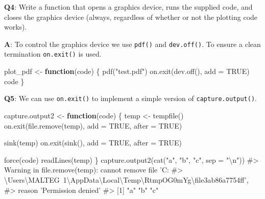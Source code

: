 \documentclass[
]{krantz}
\makeatletter
\newenvironment{Shaded}{\begin{snugshade}}{\end{snugshade}}
\newcommand{\CharTok}[1]{\textcolor[rgb]{0.31,0.60,0.02}{#1}}
\newcommand{\CommentTok}[1]{\textcolor[rgb]{0.56,0.35,0.01}{\textit{#1}}}
\newcommand{\ControlFlowTok}[1]{\textcolor[rgb]{0.13,0.29,0.53}{\textbf{#1}}}
\newcommand{\DataTypeTok}[1]{\textcolor[rgb]{0.13,0.29,0.53}{#1}}
\newcommand{\KeywordTok}[1]{\textcolor[rgb]{0.13,0.29,0.53}{\textbf{#1}}}
\newcommand{\NormalTok}[1]{#1}
\newcommand{\OtherTok}[1]{\textcolor[rgb]{0.56,0.35,0.01}{#1}}
\newcommand{\StringTok}[1]{\textcolor[rgb]{0.31,0.60,0.02}{#1}}
\newenvironment{kframe}{%
\medskip{}
\setlength{\fboxsep}{.8em}
 \def\at@end@of@kframe{}%
 \ifinner\ifhmode%
  \def\at@end@of@kframe{\end{minipage}}%
  \begin{minipage}{\columnwidth}%
 \fi\fi%
 \def\FrameCommand##1{\hskip\@totalleftmargin \hskip-\fboxsep
 \colorbox{shadecolor}{##1}\hskip-\fboxsep
     \hskip-\linewidth \hskip-\@totalleftmargin \hskip\columnwidth}%
 \MakeFramed {\advance\hsize-\width
   \@totalleftmargin\z@ \linewidth\hsize
   \@setminipage}}%
 {\par\unskip\endMakeFramed%
 \at@end@of@kframe}
\renewenvironment{Shaded}{\begin{kframe}}{\end{kframe}}
\renewcommand{\KeywordTok} [1]{\textcolor[rgb]{0.00,0.44,0.13}{{#1}}}
\renewcommand{\DataTypeTok}[1]{\textcolor[rgb]{0.56,0.13,0.00}{{#1}}}
\renewcommand{\CharTok}    [1]{\textcolor[rgb]{0.25,0.44,0.63}{{#1}}}
\renewcommand{\StringTok}  [1]{\textcolor[rgb]{0.25,0.44,0.63}{{#1}}}
\renewcommand{\CommentTok} [1]{\textcolor[rgb]{0.38,0.63,0.69}{{#1}}}
\renewcommand{\OtherTok}   [1]{\textcolor[rgb]{0.00,0.44,0.13}{{#1}}}
\renewcommand{\NormalTok}  [1]{{#1}}
\makeatother
\begin{document}
\textbf{{Q4}}: Write a function that opens a graphics device, runs the supplied code, and closes the graphics device (always, regardless of whether or not the plotting code works).

\textbf{{A}}: To control the graphics device we use \texttt{pdf()} and \texttt{dev.off()}. To ensure a clean termination \texttt{on.exit()} is used.

\begin{Shaded}
\begin{Highlighting}[]
\NormalTok{plot_pdf <-}\StringTok{ }\ControlFlowTok{function}\NormalTok{(code) \{}
  \KeywordTok{pdf}\NormalTok{(}\StringTok{"test.pdf"}\NormalTok{)}
  \KeywordTok{on.exit}\NormalTok{(}\KeywordTok{dev.off}\NormalTok{(), }\DataTypeTok{add =} \OtherTok{TRUE}\NormalTok{)}
\NormalTok{  code}
\NormalTok{\}}
\end{Highlighting}
\end{Shaded}

\textbf{{Q5}}: We can use \texttt{on.exit()} to implement a simple version of \texttt{capture.output()}.

\begin{Shaded}
\begin{Highlighting}[]
\NormalTok{capture.output2 <-}\StringTok{ }\ControlFlowTok{function}\NormalTok{(code) \{}
\NormalTok{  temp <-}\StringTok{ }\KeywordTok{tempfile}\NormalTok{()}
  \KeywordTok{on.exit}\NormalTok{(}\KeywordTok{file.remove}\NormalTok{(temp), }\DataTypeTok{add =} \OtherTok{TRUE}\NormalTok{, }\DataTypeTok{after =} \OtherTok{TRUE}\NormalTok{)}
  
  \KeywordTok{sink}\NormalTok{(temp)}
  \KeywordTok{on.exit}\NormalTok{(}\KeywordTok{sink}\NormalTok{(), }\DataTypeTok{add =} \OtherTok{TRUE}\NormalTok{, }\DataTypeTok{after =} \OtherTok{TRUE}\NormalTok{)}
  
  \KeywordTok{force}\NormalTok{(code)}
  \KeywordTok{readLines}\NormalTok{(temp)}
\NormalTok{\}}
\KeywordTok{capture.output2}\NormalTok{(}\KeywordTok{cat}\NormalTok{(}\StringTok{"a"}\NormalTok{, }\StringTok{"b"}\NormalTok{, }\StringTok{"c"}\NormalTok{, }\DataTypeTok{sep =} \StringTok{"}\CharTok{\textbackslash{}n}\StringTok{"}\NormalTok{))}
\CommentTok{#> Warning in file.remove(temp): cannot remove file 'C:}
\CommentTok{#> \textbackslash{}Users\textbackslash{}MALTEG~1\textbackslash{}AppData\textbackslash{}Local\textbackslash{}Temp\textbackslash{}RtmpOG0mYg\textbackslash{}file3ab86a7754ff',}
\CommentTok{#> reason 'Permission denied'}
\CommentTok{#> [1] "a" "b" "c"}
\end{Highlighting}
\end{Shaded}
\end{document}
